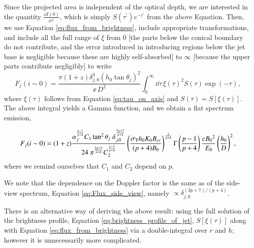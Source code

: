 Since the projected area is independent of the optical depth, we are interested in the quantity $\frac{\dd I(0)}{\dd \tau^{'}}$, which is simply $ S(\tau^{'}) e^{- \tau^{'}} $ from the above Equation. Then, we use Equation \ref{eq:flux_from_brightness}, include appropriate transformations, and include all the full range of $ \xi $ from $ 0 $ [the parts below the conical boundary do not contribute, and the error introduced in introducing regions below the jet base is negligible because these are highly self-absorbed] to $ \infty $ [because the upper parts contribute negligibly] to write
\begin{equation}
F_j (i \sim 0) = \dfrac {\pi (1+z) \delta_{j,0}^3 (h_0 \tan \theta_j)^2}{\ee \, D^2} \int_0^\infty \dd \tau \, \xi(\tau)^2 S(\tau) \exp(-\tau),
\label{eq:jet_flux_integral}
\end{equation}
where $\xi(\tau)$ follows from Equation \ref{eq:tau_on_axis} and $S(\tau) = S[ \xi(\tau) ]$. The above integral yields a Gamma function, and we obtain a flat spectrum emission,

\begin{equation}
F_j (i \sim 0) = (1+z) \dfrac{ \alpha_f^{\frac{p-1}{p+4} } C_1 \tan ^2 \theta_{j} \; \delta_{j,0}^{\frac{3p+7}{p+4}}}{24 \; \pi^{\frac{2p+3}{p+4}} C_2^{\frac{p-1}{p+4}}}\left(\dfrac{ \sigma_{\rm{T}} h_0 K_0 B_{cr}}{(p+4)B_0}\right)^{\frac{5}{p+4}}\Gamma\left(\frac{p-1}{p+4}\right) \frac{ c B_0{^2} }{E_0} \left(\frac{h_0}{D}\right)^2,
\label{eq:Flux_jet_on_axis}
\end{equation}
where we remind ourselves that $C_1$ and $C_2$ depend on $p$.

We note that the dependence on the Doppler factor is the same as of the side-view spectrum, Equation \ref{eq:Flux_side_view}, namely $\propto \delta_{j,0}^{(3p+7)/(p+4)}$.

There is an alternative way of deriving the above result: using the full solution of the brightness profile, Equation \ref{eq:brightness_profile_of_jet}, $ S[\xi(\tau)] $ along with Equation \ref{eq:flux_from_brightness} via a double-integral over $r$ and $h$; however it is unnecessarily more complicated.

